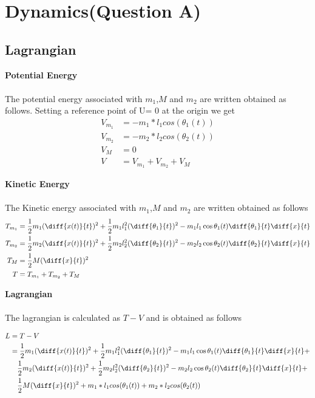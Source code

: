 \documentclass[12pt]{article}
\begin{document}

\tableofcontents
\pagebreak


\section{Dynamics(Question A)}
\subsection{Lagrangian}  
\textbf{Potential Energy}  \\ \\
The potential energy associated with $m_1$,$M$ and $m_2$ are written obtained as follows.
Setting a reference point of U= 0 at the origin  we get
\begin{align} 
  V_{m_1} &= -m_1*l_1cos(\theta _1(t)) \\
  V_{m_2} &= -m_2*l_2cos(\theta _2(t)) \\
  V_M &=0 \\
  V &= V_{m_1} +V_{m_2} + V_M
\end{align}


\textbf{Kinetic Energy}  \\ \\
The Kinetic energy associated with $m_1$,$M$ and $m_2$ are written obtained as follows
\begin{align}   
  T_{m_1} &= \frac{1}{2}m_1(\diff{x(t)}{t})^2 + \frac{1}{2}m_1l_1^2(\diff{\theta _1}{t})^2 -m_1l_1\cos \theta _1(t) \diff{\theta _1}{t} \diff{x}{t}\\
  T_{m_2} &= \frac{1}{2}m_2(\diff{x(t)}{t})^2 + \frac{1}{2}m_2l_2^2(\diff{\theta _2}{t})^2 -m_2l_2\cos \theta _2(t) \diff{\theta _2}{t} \diff{x}{t}\\
  T_M &= \frac{1}{2}M(\diff{x}{t})^2 \\
  T &= T_{m_1} +T_{m_2} + T_M 
\end{align}


\textbf{Lagrangian}  \\ \\
The lagrangian is calculated as $T - V$ and is obtained as follows

 \begin{align}
   L &= T -V \\
     &= \frac{1}{2}m_1(\diff{x(t)}{t})^2 + \frac{1}{2}m_1l_1^2(\diff{\theta _1}{t})^2 -m_1l_1\cos \theta _1(t) \diff{\theta _1}{t} \diff{x}{t} + \nonumber \\
     &\quad \frac{1}{2}m_2(\diff{x(t)}{t})^2 + \frac{1}{2}m_2l_2^2(\diff{\theta _2}{t})^2 -m_2l_2\cos \theta _2(t) \diff{\theta _2}{t} \diff{x}{t} + \nonumber \\
     &\quad \frac{1}{2}M(\diff{x}{t})^2  +m_1*l_1cos(\theta _1(t)) + m_2*l_2cos(\theta _2(t))
 \end{align}                       
\end{document}

